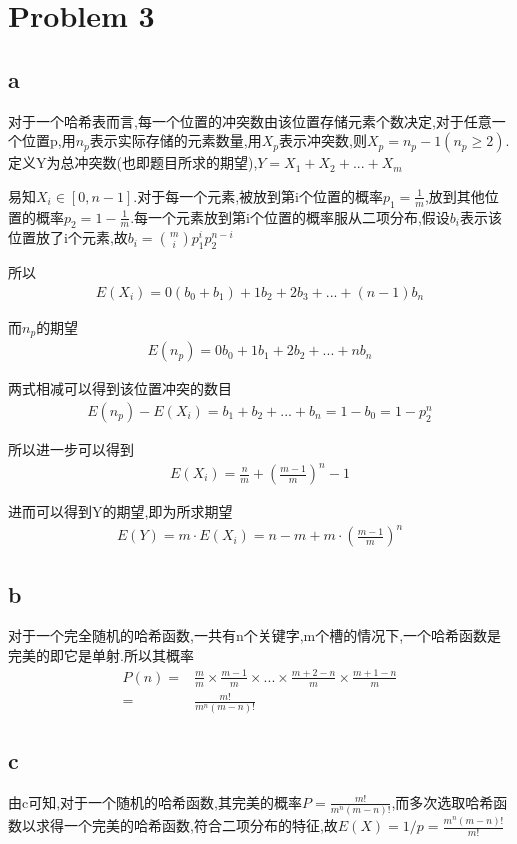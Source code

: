 \documentclass[12pt,a4paper,fontset=none]{ctexart}
\begin{document}
\section{Problem 3}
\subsection{a}
对于一个哈希表而言,每一个位置的冲突数由该位置存储元素个数决定,对于任意一个位置p,用$n_p$表示实际存储的元素数量,用$X_p$表示冲突数,则$X_p=n_p-1(n_p\geq 2)$.定义Y为总冲突数(也即题目所求的期望),$Y=X_1+X_2+...+X_m$

易知$X_i\in [0,n-1]$.对于每一个元素,被放到第i个位置的概率$p_1=\frac{1}{m} $,放到其他位置的概率$p_2=1-\frac{1}{m} $.每一个元素放到第i个位置的概率服从二项分布,假设$b_i$表示该位置放了i个元素,故$b_i=\binom{m}{i}p_1^ip_2^{n-i}$

所以
\begin{align*}
    E(X_i)=0(b_0+b_1)+1b_2+2b_3+...+(n-1)b_n
\end{align*}

而$n_p$的期望
\begin{align*}
    E(n_p)=0b_0+1b_1+2b_2+...+nb_n
\end{align*}

两式相减可以得到该位置冲突的数目
\begin{align*}
    E(n_p)-E(X_i)=b_1+b_2+...+b_n=1-b_0=1-p_2^n
\end{align*}

所以进一步可以得到
\begin{align*}
    E(X_i)=\frac{n}{m} +(\frac{m-1}{m} )^n-1
\end{align*}

进而可以得到Y的期望,即为所求期望
\begin{align*}
    E(Y)=m\cdot E(X_i)=n-m+m\cdot (\frac{m-1}{m} )^n
\end{align*}
\subsection{b}
对于一个完全随机的哈希函数,一共有n个关键字,m个槽的情况下,一个哈希函数是完美的即它是单射.所以其概率
\begin{align*}
    P(n)= & \frac{m}{m} \times \frac{m-1}{m} \times ...\times \frac{m+2-n}{m} \times \frac{m+1-n}{m} \\
    =     & \frac{m!}{m^n (m-n)!}
\end{align*}
\subsection{c}
由c可知,对于一个随机的哈希函数,其完美的概率$P=\frac{m!}{m^n (m-n)!}$,而多次选取哈希函数以求得一个完美的哈希函数,符合二项分布的特征,故$E(X)=1/p=\frac{m^n(m-n)!}{m!} $
\end{document}

